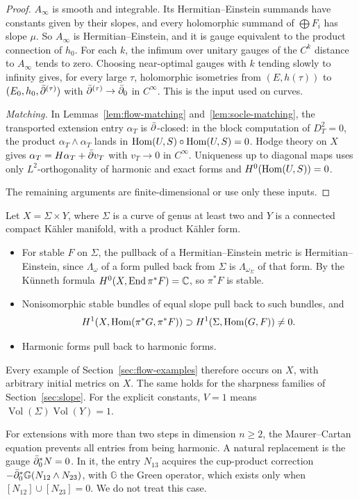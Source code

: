 \begin{proof}
$A_\infty$ is smooth and integrable. Its Hermitian--Einstein summands have
constants given by their slopes, and every holomorphic summand of
$\bigoplus F_i$ has slope $\mu$. So $A_\infty$ is Hermitian--Einstein, and it
is gauge equivalent to the product connection of $h_0$. For each $k$, the
infimum over unitary gauges of the $C^k$ distance to $A_\infty$ tends to
zero. Choosing near-optimal gauges with $k$ tending slowly to infinity gives,
for every large $\tau$, holomorphic isometries from $(E,h(\tau))$ to
$(E_0,h_0,\bar\partial^{(\tau)})$ with $\bar\partial^{(\tau)}\to\bar\partial_0$ in $C^\infty$. This is
the input used on curves.

\emph{Matching.} In Lemmas~\ref{lem:flow-matching}
and~\ref{lem:socle-matching}, the transported extension entry $\alpha_T$ is
$\bar\partial$-closed: in the block computation of $D_T^2=0$, the product
$\alpha_T\wedge\alpha_T$ lands in $\operatorname{Hom}(U,S)\circ\operatorname{Hom}(U,S)=0$. Hodge theory
on $X$ gives $\alpha_T=H\alpha_T+\bar\partial v_T$ with $v_T\to0$ in $C^\infty$.
Uniqueness up to diagonal maps uses only $L^2$-orthogonality of harmonic
and exact forms and $H^0(\operatorname{Hom}(U,S))=0$.

The remaining arguments are finite-dimensional or use only these inputs.
\end{proof}

\begin{example}\label{ex:products}
Let $X=\Sigma\times Y$, where $\Sigma$ is a curve of genus at least two and $Y$ is a
connected compact K\"ahler manifold, with a product K\"ahler form.
\begin{itemize}
\item For stable $F$ on $\Sigma$, the pullback of a Hermitian--Einstein metric is
 Hermitian--Einstein, since $\Lambda_\omega$ of a form pulled back from $\Sigma$
 is $\Lambda_{\omega_\Sigma}$ of that form. By the K\"unneth formula
 $H^0(X,\operatorname{End}\pi^*F)=\mathbb C$, so $\pi^*F$ is stable.
\item Nonisomorphic stable bundles of equal slope pull back to such
 bundles, and
 \[
  H^1(X,\operatorname{Hom}(\pi^*G,\pi^*F))\supset H^1(\Sigma,\operatorname{Hom}(G,F))\ne0.
 \]
\item Harmonic forms pull back to harmonic forms.
\end{itemize}
Every example of Section~\ref{sec:flow-examples} therefore occurs on $X$,
with arbitrary initial metrics on $X$. The same holds for the sharpness
families of Section~\ref{sec:slope}. For the explicit constants,
$V=1$ means $\operatorname{Vol}(\Sigma)\operatorname{Vol}(Y)=1$.
\end{example}

For extensions with more than two steps in dimension $n\ge2$, the
Maurer--Cartan equation prevents all entries from being harmonic. A natural
replacement is the gauge $\bar\partial_0^*N=0$. In it, the entry $N_{13}$ acquires
the cup-product correction $-\bar\partial_0^*\mathbb G(N_{12}\wedge N_{23})$, with
$\mathbb G$ the Green operator, which exists
only when $[N_{12}]\cup[N_{23}]=0$. We do not treat this case.
